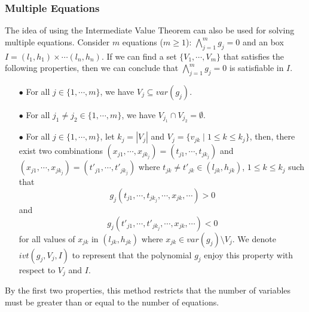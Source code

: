 \documentclass[runningheads,a4paper,oribibl]{llncs}
\begin{document}
\subsubsection*{Multiple Equations}
The idea of using the Intermediate Value Theorem can also be used for solving multiple equations. 
Consider $m$ equations ($m \ge 1$): $\bigwedge \limits_{j=1}^m g_j = 0$ and an box $ I = {(l_1, h_1) \times \cdots (l_n, h_n)}$. If we can find a set ${\{V_1, \cdots, V_m\}}$ that satisfies the following properties, then we can conclude that $\bigwedge \limits_{j=1}^m g_j = 0$ is satisfiable in $I$.
\begin{itemize}
\item[$\bullet$] For all $j \in \{1, \cdots, m\}$, we have ${V_j \subseteq var(g_j)}$.
\item[$\bullet$] For all $j_1 \neq j_2\in \{1, \cdots, m\}$, we have $V_{j_1} \cap V_{j_2} = \emptyset$.
\item[$\bullet$] For all $j\in \{1, \cdots, m\}$, let $k_j = |V_j|$ and ${V_j = \{v_{jk} \; | \; 1 \le k \le k_j \}}$, then, there exist two combinations ${(x_{j1}, \cdots, x_{jk_j}) = (t_{j1}, \cdots, t_{jk_j})}$ and ${(x_{j1}, \cdots, x_{jk_j}) = (t'_{j1}, \cdots, t'_{jk_j})}$ where $t_{jk} \neq t'_{jk} \in (l_{jk}, h_{jk})$, $1 \le k \le k_j$ such that \[g_j(t_{j1}, \cdots, t_{jk_j}, \cdots, x_{jk}, \cdots) > 0\] and \[g_j(t'_{j1}, \cdots, t'_{jk_j}, \cdots, x_{jk}, \cdots) < 0\] for all values of $x_{jk}$ in $(l_{jk}, h_{jk})$ where $x_{jk} \in var(g_j) \setminus V_j$. We denote $ivt(g_j, V_j, I)$ to represent that the polynomial $g_j$ enjoy this property with respect to $V_j$ and $I$.
\end{itemize}
By the first two properties, this method restricts that the number of variables must be greater than or equal to the number of equations.
\end{document}
